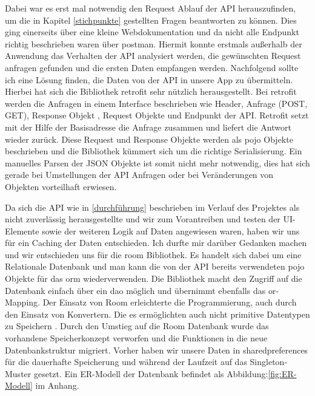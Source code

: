 Dabei war es erst mal notwendig den Request Ablauf der API herauszufinden, um die in Kapitel \ref{stichpunkte} gestellten Fragen beantworten zu können. Dies ging einerseits über eine kleine Webdokumentation und da nicht alle Endpunkt richtig beschrieben
 waren über \gls{postman}. Hiermit konnte erstmals außerhalb der Anwendung das Verhalten der API analysiert werden, die gewünschten Request anfragen gefunden und die ersten Daten empfangen werden. Nachfolgend sollte ich eine Lösung finden, die Daten von der API in unsere App zu übermitteln. Hierbei hat sich die Bibliothek \gls{retrofit} sehr nützlich herausgestellt. Bei \gls{retrofit} werden die Anfragen in einem Interface beschrieben wie Header, Anfrage (POST, GET), Response Objekt , Request
  Objekte und Endpunkt der API. Retrofit setzt mit der Hilfe der Basisadresse die Anfrage zusammen und liefert die Antwort wieder zurück. Diese Request und Response Objekte werden als \ac{pojo} Objekte beschrieben und die Bibliothek kümmert sich um die richtige Serialisierung. Ein manuelles Parsen der JSON Objekte ist somit nicht mehr notwendig, dies hat sich gerade bei Umstellungen der API Anfragen oder bei Veränderungen von Objekten vorteilhaft erwiesen.

Da sich die API wie in \ref{durchführung} beschrieben im Verlauf des Projektes als nicht zuverlässig herausgestellte  und wir zum Vorantreiben und testen der UI-Elemente sowie der weiteren Logik auf Daten angewiesen waren, haben wir uns für ein Caching der Daten entschieden. Ich durfte mir darüber Gedanken machen und wir entschieden uns für   die \gls{room} Bibliothek. Es handelt sich dabei um eine Relationale Datenbank und man kann die von der API bereits verwendeten \ac{pojo} Objekte für das \ac{orm} wiederverwenden. Die Bibliothek macht den Zugriff auf die Datenbank einfach über ein \ac{dao}  möglich und übernimmt ebenfalls das \ac{or}-Mapping. Der Einsatz von Room erleichterte die Programmierung, auch durch den Einsatz von Konvertern. Die es ermöglichten auch nicht primitive Datentypen zu Speichern . 
Durch den Umstieg auf die Room Datenbank wurde das vorhandene Speicherkonzept verworfen und die Funktionen in die neue Datenbankstruktur migriert.
Vorher haben wir unsere Daten in \gls{sharedpreferences} für die dauerhafte Speicherung und während der Laufzeit auf das Singleton-Muster gesetzt.
Ein ER-Modell der Datenbank befindet als Abbildung:\ref{fig:ER-Modell}  im Anhang.

